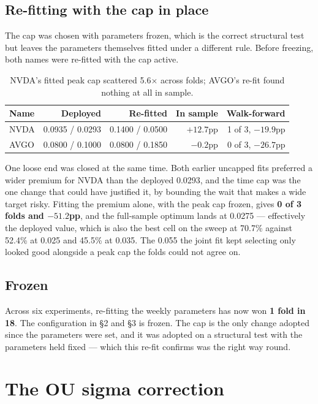 \documentclass[11pt]{article}
\begin{document}
\subsection{Re-fitting with the cap in place}

The cap was chosen with parameters frozen, which is the correct structural test but leaves the
parameters themselves fitted under a different rule. Before freezing, both names were re-fitted
with the cap active.

\begin{table}[H]\centering\small
\begin{tabular}{lrrrr}
\toprule
\textbf{Name} & \textbf{Deployed} & \textbf{Re-fitted} & \textbf{In sample} &
\textbf{Walk-forward}\\
\midrule
\rowcolor{bckeep} NVDA & 0.0935 / 0.0293 & 0.1400 / 0.0500 & $+12.7$pp & 1 of 3, $-19.9$pp\\
AVGO & 0.0800 / 0.1000 & 0.0800 / 0.1850 & $-0.2$pp & 0 of 3, $-26.7$pp\\
\bottomrule
\end{tabular}
\caption{NVDA's fitted peak cap scattered 5.6$\times$ across folds; AVGO's re-fit found nothing at
all in sample.}
\end{table}

One loose end was closed at the same time. Both earlier uncapped fits preferred a wider premium
for NVDA than the deployed 0.0293, and the time cap was the one change that could have justified
it, by bounding the wait that makes a wide target risky. Fitting the premium alone, with the peak
cap frozen, gives \textbf{0 of 3 folds and $-51.2$pp}, and the full-sample optimum lands at
0.0275 --- effectively the deployed value, which is also the best cell on the sweep at 70.7\%
against 52.4\% at 0.025 and 45.5\% at 0.035. The 0.055 the joint fit kept selecting only looked
good alongside a peak cap the folds could not agree on.

\subsection{Frozen}

Across six experiments, re-fitting the weekly parameters has now won \textbf{1 fold in 18}. The
configuration in \S2 and \S3 is frozen. The cap is the only change adopted since the parameters
were set, and it was adopted on a structural test with the parameters held fixed --- which this
re-fit confirms was the right way round.

\section{The OU sigma correction}
\end{document}
